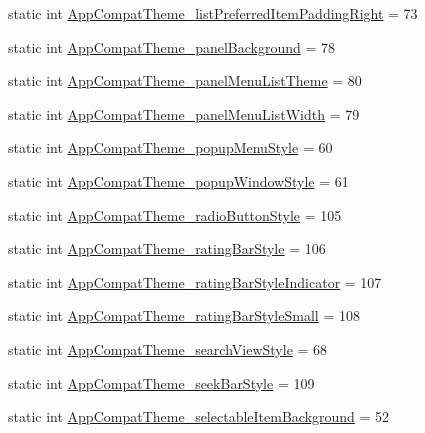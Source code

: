 \begin{DoxyCompactItemize}
static int \hyperlink{classandroid_1_1support_1_1design_1_1R_1_1styleable_a88a4a9392e587ed500ccdae581df5835}{App\+Compat\+Theme\+\_\+list\+Preferred\+Item\+Padding\+Right} = 73
\item 
static int \hyperlink{classandroid_1_1support_1_1design_1_1R_1_1styleable_a29b397614d1d7cf59c6c120c90e3b529}{App\+Compat\+Theme\+\_\+panel\+Background} = 78
\item 
static int \hyperlink{classandroid_1_1support_1_1design_1_1R_1_1styleable_a8c51cf0e087c4190c18f5548d4dfad15}{App\+Compat\+Theme\+\_\+panel\+Menu\+List\+Theme} = 80
\item 
static int \hyperlink{classandroid_1_1support_1_1design_1_1R_1_1styleable_aeff64b02915a67a11df8dde49e714e6d}{App\+Compat\+Theme\+\_\+panel\+Menu\+List\+Width} = 79
\item 
static int \hyperlink{classandroid_1_1support_1_1design_1_1R_1_1styleable_a98dfd09dfbb476ddbf9036698ee8bf9c}{App\+Compat\+Theme\+\_\+popup\+Menu\+Style} = 60
\item 
static int \hyperlink{classandroid_1_1support_1_1design_1_1R_1_1styleable_a2f386a19b0732d76a79e7a070ee99feb}{App\+Compat\+Theme\+\_\+popup\+Window\+Style} = 61
\item 
static int \hyperlink{classandroid_1_1support_1_1design_1_1R_1_1styleable_abf40525373a47503a3a32d0d28968936}{App\+Compat\+Theme\+\_\+radio\+Button\+Style} = 105
\item 
static int \hyperlink{classandroid_1_1support_1_1design_1_1R_1_1styleable_a489467c128791a96f0a6869127a31cba}{App\+Compat\+Theme\+\_\+rating\+Bar\+Style} = 106
\item 
static int \hyperlink{classandroid_1_1support_1_1design_1_1R_1_1styleable_acb5f552d97fb774eb23c5a37ac305002}{App\+Compat\+Theme\+\_\+rating\+Bar\+Style\+Indicator} = 107
\item 
static int \hyperlink{classandroid_1_1support_1_1design_1_1R_1_1styleable_a2d2923d5071be320451a0bd71d92c8f6}{App\+Compat\+Theme\+\_\+rating\+Bar\+Style\+Small} = 108
\item 
static int \hyperlink{classandroid_1_1support_1_1design_1_1R_1_1styleable_a7f20a034b36b7ab747f54d15503472b8}{App\+Compat\+Theme\+\_\+search\+View\+Style} = 68
\item 
static int \hyperlink{classandroid_1_1support_1_1design_1_1R_1_1styleable_a3a0b8e9f055894c1859484655adc6db6}{App\+Compat\+Theme\+\_\+seek\+Bar\+Style} = 109
\item 
static int \hyperlink{classandroid_1_1support_1_1design_1_1R_1_1styleable_ad98a8eb57d72c1fb3c3e08668a810c3c}{App\+Compat\+Theme\+\_\+selectable\+Item\+Background} = 52

\end{DoxyCompactItemize}
